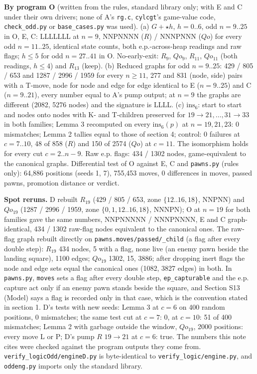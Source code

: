\textbf{By program O} (written from the rules, standard library only; with E and C under their own drivers; none of A's \texttt{rg.c}, \texttt{cylcgt}'s game-value code, \texttt{check\_odd.py} or \texttt{base\_cases.py} was used). (a) $G+\star h$, $h=0..6$, odd $n=9..25$ in O, E, C: LLLLLLL at $n=9$, NNPNNNN ($R$) / NNNPNNN ($Qo$) for every odd $n=11..25$, identical state counts, both e.p.-across-heap readings and raw flags; $h\le5$ for odd $n=27..41$ in O. No-early-exit: $R_9$, $Qo_9$, $R_{11}$, $Qo_{11}$ (both readings, $h\le4$) and $R_{13}$ (keep). (b) Reduced graphs for odd $n=9..25$: 429 / 805 / 653 and 1287 / 2996 / 1959 for every $n\ge11$, 277 and 831 (node, side) pairs with a T-move, node for node and edge for edge identical to E ($n=9..25$) and C ($n=9..21$), every number equal to A's pump output; at $n=9$ the graphs are different (2082, 5276 nodes) and the signature is LLLL. (c) $\mathrm{ins}_6$: start to start and nodes onto nodes with K- and T-children preserved for $19\to21,\dots,31\to33$ in both families; Lemma 3 recomputed on every $\mathrm{ins}_6(p)$ at $n=19,21,23$: 0 mismatches; Lemma 2 tallies equal to those of section 4; control: 0 failures at $c=7..10$, 48 of 858 ($R$) and 150 of 2574 ($Qo$) at $c=11$. The isomorphism holds for every cut $c=2..n-9$. Raw e.p. flags: 434 / 1302 nodes, game-equivalent to the canonical graphs. Differential test of O against E, C and \texttt{pawns.py} (rules only): 64,886 positions (seeds 1, 7), 755,453 moves, 0 differences in moves, passed pawns, promotion distance or verdict.

\textbf{Spot reruns.} D rebuilt $R_{19}$ (429 / 805 / 653, zone $\{12..16,18\}$, NNPNN) and $Qo_{19}$ (1287 / 2996 / 1959, zone $\{0,1,12..16,18\}$, NNNPN); O at $n=19$ for both families gave the same numbers, NNPNNNNN / NNNPNNNN, E and C graph-identical, 434 / 1302 raw-flag nodes equivalent to the canonical ones. The raw-flag graph rebuilt directly on \texttt{pawns.moves/passed/\_child} (a flag after every double step): $R_{19}$ 434 nodes, 5 with a flag, none live (an enemy pawn beside the landing square), 1100 edges; $Qo_{19}$ 1302, 15, 3886; after dropping inert flags the node and edge sets equal the canonical ones (1082, 3827 edges) in both. In \texttt{pawns.py}, \texttt{moves} sets a flag after every double step, \texttt{ep\_capturable} and the e.p. capture act only if an enemy pawn stands beside the square, and Section S13 (Model) says a flag is recorded only in that case, which is the convention stated in section 1. D's tests with new seeds: Lemma 3 at $c=6$ on 400 random positions, 0 mismatches; the same test cut at $c=7$: 0, at $c=10$: 51 of 400 mismatches; Lemma 2 with garbage outside the window, $Qo_{19}$, 2000 positions: every move L or P; D's pump $R$ $19\to21$ at $c=6$: true. The numbers this note cites were checked against the program outputs they come from. \texttt{verify\_logicOdd/engineD.py} is byte-identical to \texttt{verify\_logic/engine.py}, and \texttt{oddeng.py} imports only the standard library.


